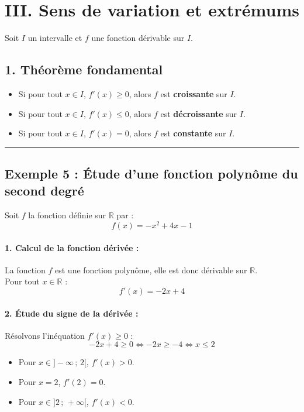 \documentclass[12pt,a4paper]{article}
\begin{document}

\section*{\color{myred}III. Sens de variation et extrémums}

Soit $I$ un intervalle et $f$ une fonction dérivable sur $I$.

\subsection*{\color{myred}1. Théorème fondamental}
\begin{itemize}
    \item Si pour tout $x \in I$, $f'(x) \geq 0$, alors $f$ est \textbf{croissante} sur $I$.
    \item Si pour tout $x \in I$, $f'(x) \leq 0$, alors $f$ est \textbf{décroissante} sur $I$.
    \item Si pour tout $x \in I$, $f'(x) = 0$, alors $f$ est \textbf{constante} sur $I$.
\end{itemize}

\vspace{0.3cm}
\hrule
\vspace{0.3cm}

\subsection*{\color{myred}Exemple 5 : Étude d'une fonction polynôme du second degré}

Soit $f$ la fonction définie sur $\mathbb{R}$ par :
\[
f(x) = -x^2 + 4x - 1
\]

\paragraph{1. Calcul de la fonction dérivée :}
La fonction $f$ est une fonction polynôme, elle est donc dérivable sur $\mathbb{R}$.\\
Pour tout $x \in \mathbb{R}$ :
\[
f'(x) = -2x + 4
\]

\paragraph{2. Étude du signe de la dérivée :}
Résolvons l'inéquation $f'(x) \ge 0$ :
\[
-2x + 4 \ge 0 \iff -2x \ge -4 \iff x \le 2
\]
\begin{itemize}
    \item Pour $x \in ]-\infty \,;\, 2[$, $f'(x) > 0$.
    \item Pour $x = 2$, $f'(2) = 0$.
    \item Pour $x \in ]2 \,;\, +\infty[$, $f'(x) < 0$.
\end{itemize}
\end{document}
